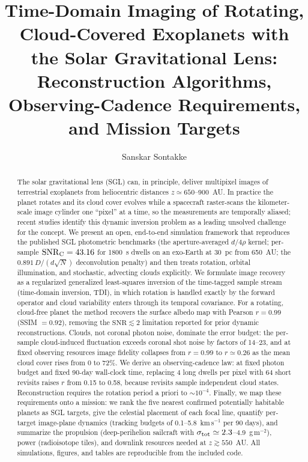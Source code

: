 ﻿\documentclass[twocolumn]{emulateapj}
\begin{document}
\title{Time-Domain Imaging of Rotating, Cloud-Covered Exoplanets with the
Solar Gravitational Lens: Reconstruction Algorithms, Observing-Cadence
Requirements, and Mission Targets}

\author{Sanskar Sontakke}

\begin{abstract}
The solar gravitational lens (SGL) can, in principle, deliver multipixel
images of terrestrial exoplanets from heliocentric distances
$z\simeq650$--900~AU. In practice the planet rotates and its cloud cover
evolves while a spacecraft raster-scans the kilometer-scale image cylinder
one ``pixel'' at a time, so the measurements are temporally aliased; recent
studies identify this dynamic inversion problem as a leading unsolved
challenge for the concept. We present an open, end-to-end simulation
framework that reproduces the published SGL photometric benchmarks (the
aperture-averaged $d/4\rho$ kernel; per-sample $\mathrm{SNR}_{\rm C}=43.16$
for 1800~s dwells on an exo-Earth at 30~pc from 650~AU; the
$0.891\,D/(d\sqrt{N})$ deconvolution penalty) and then treats rotation,
orbital illumination, and stochastic, advecting clouds explicitly. We
formulate image recovery as a regularized generalized least-squares
inversion of the time-tagged sample stream (time-domain inversion, TDI),
in which rotation is handled exactly by the forward operator and cloud
variability enters through its temporal covariance. For a rotating,
cloud-free planet the method recovers the surface albedo map with Pearson
$r=0.99$ (SSIM $=0.92$), removing the $\mathrm{SNR}\lesssim2$ limitation
reported for prior dynamic reconstructions. Clouds, not coronal photon
noise, dominate the error budget: the per-sample cloud-induced fluctuation
exceeds coronal shot noise by factors of 14--23, and at fixed observing
resources image fidelity collapses from $r=0.99$ to $r\simeq0.26$ as the
mean cloud cover rises from 0 to 72\%. We derive an observing-cadence
law: at fixed photon budget and fixed 90-day wall-clock time, replacing 4
long dwells per pixel with 64 short revisits raises $r$ from 0.15 to 0.58,
because revisits sample independent cloud states. Reconstruction requires
the rotation period a priori to $\sim10^{-4}$. Finally, we map these
requirements onto a mission: we rank the five nearest confirmed
potentially habitable planets as SGL targets, give the celestial
placement of each focal line, quantify per-target image-plane dynamics
(tracking budgets of 0.1--5.8~km\,s$^{-1}$ per 90 days), and summarize the
propulsion (deep-perihelion sailcraft with
$\sigma_{\rm tot}\simeq2.3$--4.9~g\,m$^{-2}$), power (radioisotope tiles),
and downlink resources needed at $z\gtrsim550$~AU. All simulations,
figures, and tables are reproducible from the included code.
\end{abstract}
\end{document}
